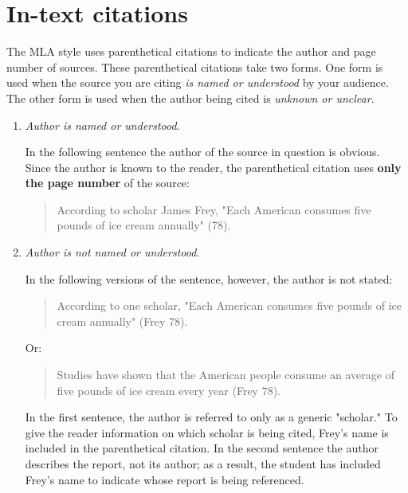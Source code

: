 \newpage

\section{In-text citations}
The MLA style uses parenthetical citations to indicate the author and page number of sources. These parenthetical citations take two forms. One form is used when the source you are citing \emph{is named or understood} by your audience. The other form is used when the author being cited is \emph{unknown or unclear}. 

\begin{enumerate}

\item \emph{Author is named or understood}. \smallskip

In the following sentence the author of the source in question is obvious. Since the author is known to the reader, the parenthetical citation uses \textbf{only the page number} of the source: 

\begin{quote}
According to scholar James Frey, "Each American consumes five pounds of ice cream 
annually" (78).
\end{quote}

\item \emph{Author is not named or understood}. \smallskip

In the following versions of the sentence, however, the author is not stated:

\begin{quote}
According to one scholar, "Each American consumes five pounds of ice cream 
annually" (Frey 78).
\end{quote}

\noindent Or:
\begin{quote}
Studies have shown that the American people consume an average of five pounds of ice 
cream every year (Frey 78).
\end{quote}

\noindent In the first sentence, the author is referred to only as a generic "scholar." To give the reader information on which scholar is being cited, Frey's name is included in the parenthetical citation. In the second sentence the author describes the report, not its author; as a result, the student has included Frey's name to indicate whose report is being referenced. 

\end{enumerate}

